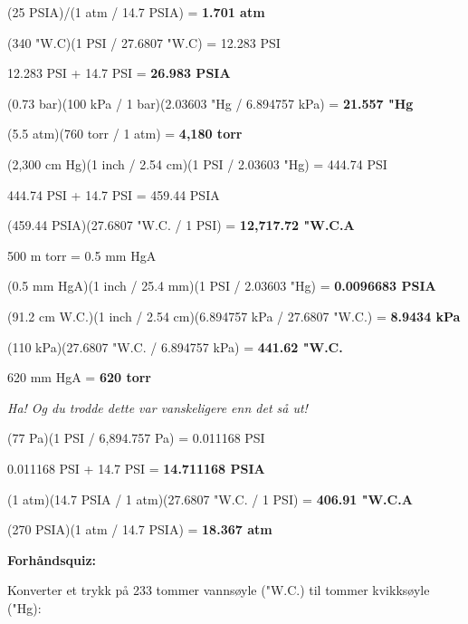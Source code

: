 \vskip 10pt

(25 PSIA)/(1 atm / 14.7 PSIA) = {\bf 1.701 atm}

\vskip 10pt

(340 "W.C)(1 PSI / 27.6807 "W.C) = 12.283 PSI

12.283 PSI + 14.7 PSI = {\bf 26.983 PSIA}

\vskip 10pt

(0.73 bar)(100 kPa / 1 bar)(2.03603 "Hg / 6.894757 kPa) = {\bf 21.557 "Hg}

\vskip 10pt

(5.5 atm)(760 torr / 1 atm) = {\bf 4,180 torr}

\vskip 10pt

(2,300 cm Hg)(1 inch / 2.54 cm)(1 PSI / 2.03603 "Hg) = 444.74 PSI

444.74 PSI + 14.7 PSI = 459.44 PSIA

(459.44 PSIA)(27.6807 "W.C. / 1 PSI) = {\bf 12,717.72 "W.C.A}

\vskip 10pt

500 m torr = 0.5 mm HgA

(0.5 mm HgA)(1 inch / 25.4 mm)(1 PSI / 2.03603 "Hg) = {\bf 0.0096683 PSIA}

\vskip 10pt

(91.2 cm W.C.)(1 inch / 2.54 cm)(6.894757 kPa / 27.6807 "W.C.) = {\bf 8.9434 kPa}

\vskip 10pt

(110 kPa)(27.6807 "W.C. / 6.894757 kPa) = {\bf 441.62 "W.C.}

\vskip 10pt

620 mm HgA = {\bf 620 torr}

{\it Ha! Og du trodde dette var vanskeligere enn det så ut!}

\vskip 10pt

(77 Pa)(1 PSI / 6,894.757 Pa) = 0.011168 PSI

0.011168 PSI + 14.7 PSI = {\bf 14.711168 PSIA}

\vskip 10pt

(1 atm)(14.7 PSIA / 1 atm)(27.6807 "W.C. / 1 PSI) = {\bf 406.91 "W.C.A}

\vskip 10pt

(270 PSIA)(1 atm / 14.7 PSIA) = {\bf 18.367 atm}







\vfil \eject

\noindent
{\bf Forhåndsquiz:}

Konverter et trykk på 233 tommer vannsøyle ("W.C.) til tommer kvikksøyle ("Hg):

